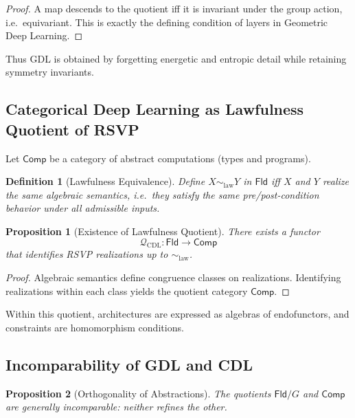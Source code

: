 \documentclass[11pt]{article}
\newtheorem{definition}{Definition}
\newtheorem{proposition}{Proposition}
\begin{document}
\begin{proof}
A map descends to the quotient iff it is invariant under the group action,
i.e.\ equivariant. This is exactly the defining condition of layers in Geometric
Deep Learning.
\end{proof}

Thus GDL is obtained by forgetting energetic and entropic detail while retaining
symmetry invariants.

\subsection{Categorical Deep Learning as Lawfulness Quotient of RSVP}

Let $\mathsf{Comp}$ be a category of abstract computations (types and programs).

\begin{definition}[Lawfulness Equivalence]
Define $X \sim_{\mathrm{law}} Y$ in $\mathsf{Fld}$ iff $X$ and $Y$ realize the same
algebraic semantics, i.e.\ they satisfy the same pre/post-condition behavior
under all admissible inputs.
\end{definition}

\begin{proposition}[Existence of Lawfulness Quotient]
There exists a functor
\[
\mathcal{Q}_{\mathrm{CDL}} : \mathsf{Fld} \to \mathsf{Comp}
\]
that identifies RSVP realizations up to $\sim_{\mathrm{law}}$.
\end{proposition}

\begin{proof}
Algebraic semantics define congruence classes on realizations. Identifying
realizations within each class yields the quotient category $\mathsf{Comp}$.
\end{proof}

Within this quotient, architectures are expressed as algebras of endofunctors,
and constraints are homomorphism conditions.

\subsection{Incomparability of GDL and CDL}

\begin{proposition}[Orthogonality of Abstractions]
The quotients $\mathsf{Fld}/G$ and $\mathsf{Comp}$ are generally incomparable:
neither refines the other.
\end{proposition}
\end{document}
